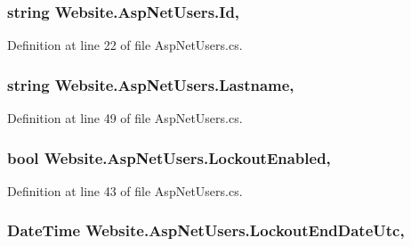 \subsubsection[{Id}]{\setlength{\rightskip}{0pt plus 5cm}string Website.\+Asp\+Net\+Users.\+Id\hspace{0.3cm}{\ttfamily [get]}, {\ttfamily [set]}}\label{class_website_1_1_asp_net_users_a2c195fc5927d9592974ba250b28815e2}


Definition at line 22 of file Asp\+Net\+Users.\+cs.

\hypertarget{class_website_1_1_asp_net_users_aef6d42730d88efe9b9cbc205c2818201}{}
\subsubsection[{Lastname}]{\setlength{\rightskip}{0pt plus 5cm}string Website.\+Asp\+Net\+Users.\+Lastname\hspace{0.3cm}{\ttfamily [get]}, {\ttfamily [set]}}\label{class_website_1_1_asp_net_users_aef6d42730d88efe9b9cbc205c2818201}


Definition at line 49 of file Asp\+Net\+Users.\+cs.

\hypertarget{class_website_1_1_asp_net_users_a1fb370b8e88bf04a2375a371cf0790a8}{}
\subsubsection[{Lockout\+Enabled}]{\setlength{\rightskip}{0pt plus 5cm}bool Website.\+Asp\+Net\+Users.\+Lockout\+Enabled\hspace{0.3cm}{\ttfamily [get]}, {\ttfamily [set]}}\label{class_website_1_1_asp_net_users_a1fb370b8e88bf04a2375a371cf0790a8}


Definition at line 43 of file Asp\+Net\+Users.\+cs.

\hypertarget{class_website_1_1_asp_net_users_aac8b2b0cf2a3fce8b307c260e7e579ba}{}
\subsubsection[{Lockout\+End\+Date\+Utc}]{\setlength{\rightskip}{0pt plus 5cm}Date\+Time Website.\+Asp\+Net\+Users.\+Lockout\+End\+Date\+Utc\hspace{0.3cm}{\ttfamily [get]}, {\ttfamily [set]}}\label{class_website_1_1_asp_net_users_aac8b2b0cf2a3fce8b307c260e7e579ba}


